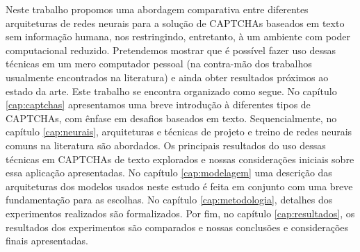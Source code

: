 Neste trabalho propomos uma abordagem comparativa entre diferentes arquiteturas de redes neurais para a solução de CAPTCHAs baseados em texto sem informação humana, nos restringindo, entretanto, à um ambiente com poder computacional reduzido. Pretendemos mostrar que é possível fazer uso dessas técnicas em um mero computador pessoal (na contra-mão dos trabalhos usualmente encontrados na literatura) e ainda obter resultados próximos ao estado da arte. Este trabalho se encontra organizado como segue. No capítulo \ref{cap:captchas} apresentamos uma breve introdução à diferentes tipos de CAPTCHAs, com ênfase em desafios baseados em texto. Sequencialmente, no capítulo \ref{cap:neurais}, arquiteturas e técnicas de projeto e treino de redes neurais comuns na literatura são abordados. Os principais resultados do uso dessas técnicas em CAPTCHAs de texto explorados e nossas considerações iniciais sobre essa aplicação apresentadas. No capítulo \ref{cap:modelagem} uma descrição das arquiteturas dos modelos usados neste estudo é feita em conjunto com uma breve fundamentação para as escolhas. No capítulo \ref{cap:metodologia}, detalhes dos experimentos realizados são formalizados. Por fim, no capítulo \ref{cap:resultados}, os resultados dos experimentos são comparados e nossas conclusões e considerações finais apresentadas. 
